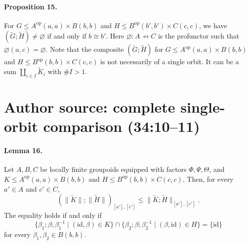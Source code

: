 \documentclass[10pt,a4paper]{article}
\newcommand{\pf}{\mathrel{\nrightarrow}}
\newcommand{\norm}[1]{\lVert#1\rVert}
\begin{document}
\paragraph{Proposition 15.} For $G\le A^{\mathrm{op}}(a,a)\times B(b,b)$ and $H\le B^{\mathrm{op}}(b',b')\times C(c,c)$, we have $(\widetilde G;\widetilde H)\ne\varnothing$ if and only if $b\cong b'$. Here $\varnothing:A\pf C$ is the profunctor such that $\varnothing(a,c)=\varnothing$.
Note that the composite $(\widetilde G;\widetilde H)$ for $G\le A^{\mathrm{op}}(a,a)\times B(b,b)$ and $H\le B^{\mathrm{op}}(b,b)\times C(c,c)$ is not necessarily of a single orbit. It can be a sum $\coprod_{i\in I}\widetilde K_i$ with $\#I>1$.

\section*{Author source: complete single-orbit comparison (34:10--11)}
\paragraph{Lemma 16.} Let $A,B,C$ be locally finite groupoids equipped with factors $\Phi,\Psi,\Theta$, and $K\le A^{\mathrm{op}}(a,a)\times B(b,b)$ and $H\le B^{\mathrm{op}}(b,b)\times C(c,c)$. Then, for every $a'\in A$ and $c'\in C$,
\[
(\norm{\widetilde K};\norm{\widetilde H})_{[a'],[c']}\le
\norm{\widetilde K;\widetilde H}_{[a'],[c']}.
\]
The equality holds if and only if
\[
\{\beta_1;\beta;\beta_1^{-1}\mid(\mathrm{id},\beta)\in K\}
\cap\{\beta_2;\beta;\beta_2^{-1}\mid(\beta,\mathrm{id})\in H\}
=\{\mathrm{id}\}
\]
for every $\beta_1,\beta_2\in B(b,b)$.
\end{document}
